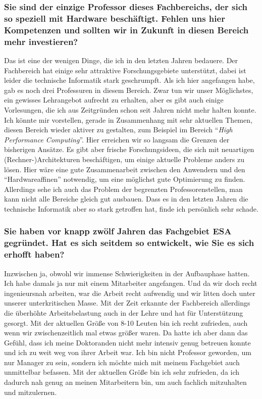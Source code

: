{    \subsubsection{Sie sind der einzige Professor dieses Fachbereichs, der sich so speziell mit Hardware beschäftigt. Fehlen uns hier Kompetenzen und sollten wir in Zukunft in diesen Bereich mehr investieren?}
    Das ist eine der wenigen Dinge, die ich in den letzten Jahren bedauere. Der Fachbereich hat einige sehr attraktive Forschungsgebiete unterstützt, dabei ist leider die technische Informatik stark geschrumpft. Als ich hier angefangen habe, gab es noch drei Professuren in diesem Bereich. Zwar tun wir unser Möglichstes, ein gewisses Lehrangebot aufrecht zu erhalten, aber es gibt auch einige Vorlesungen, die ich aus Zeitgründen schon seit Jahren nicht mehr halten konnte. Ich könnte mir vorstellen, gerade in Zusammenhang mit sehr aktuellen Themen, diesen Bereich wieder aktiver zu gestalten, zum Beispiel im Bereich "`\textit{High Performance Computing}"'. Hier erreichen wir so langsam die Grenzen der bisherigen Ansätze. Es gibt aber frische Forschungsideen, die sich mit neuartigen (Rechner-)Architekturen beschäftigen, um einige aktuelle Probleme anders zu lösen. Hier wäre eine gute Zusammenarbeit zwischen den Anwendern und den "`Hardwareaffinen"' notwendig, um eine möglichst gute Optimierung zu finden. Allerdings sehe ich auch das Problem der begrenzten Professorenstellen, man kann nicht alle Bereiche gleich gut ausbauen. Dass es in den letzten Jahren die technische Informatik aber so stark getroffen hat, finde ich persönlich sehr schade.

    \subsubsection{Sie haben vor knapp zwölf Jahren das Fachgebiet ESA gegründet. Hat es sich seitdem so entwickelt, wie Sie es sich erhofft haben?}
    Inzwischen ja, obwohl wir immense Schwierigkeiten in der Aufbauphase hatten. Ich habe damals ja nur mit einem Mitarbeiter angefangen. Und da wir doch recht ingenieursnah arbeiten, war die Arbeit recht aufwendig und wir litten doch unter unserer unterkritischen Masse. Mit der Zeit erkannte der Fachbereich allerdings die überhöhte Arbeitsbelastung auch in der Lehre und hat für Unterstützung gesorgt. Mit der aktuellen Größe von 8-10 Leuten bin ich recht zufrieden, auch wenn wir zwischenzeitlich mal etwas größer waren. Da hatte ich aber dann das Gefühl, dass ich meine Doktoranden nicht mehr intensiv genug betreuen konnte und ich zu weit weg von ihrer Arbeit war. Ich bin nicht Professor geworden, um nur Manager zu sein, sondern ich möchte mich mit meinem Fachgebiet auch unmittelbar befassen. Mit der aktuellen Größe bin ich sehr zufrieden, da ich dadurch nah genug an meinen Mitarbeitern bin, um auch fachlich mitzuhalten und mitzulernen.

}

